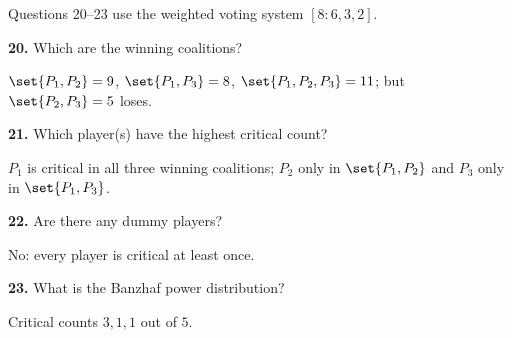 \documentclass[12pt]{ximera}
\begin{document}
\begin{problem}
Questions 20--23 use the weighted voting system $[8:6,3,2]$.

\begin{prompt}
\textbf{20.} Which are the winning coalitions?
\begin{multipleChoice}
\end{multipleChoice}
\begin{feedback}
$\set{P_1,P_2}=9$, $\set{P_1,P_3}=8$, $\set{P_1,P_2,P_3}=11$; but $\set{P_2,P_3}=5$ loses.
\end{feedback}
\end{prompt}

\begin{prompt}
\textbf{21.} Which player(s) have the highest critical count?
\begin{multipleChoice}
\end{multipleChoice}
\begin{feedback}
$P_1$ is critical in all three winning coalitions; $P_2$ only in $\set{P_1,P_2}$ and $P_3$ only in $\set{P_1,P_3}$.
\end{feedback}
\end{prompt}

\begin{prompt}
\textbf{22.} Are there any dummy players?
\begin{multipleChoice}
\end{multipleChoice}
\begin{feedback}
No: every player is critical at least once.
\end{feedback}
\end{prompt}

\begin{prompt}
\textbf{23.} What is the Banzhaf power distribution?
\begin{multipleChoice}
\end{multipleChoice}
\begin{feedback}
Critical counts $3,1,1$ out of $5$.
\end{feedback}
\end{prompt}
\end{problem}
\end{document}
